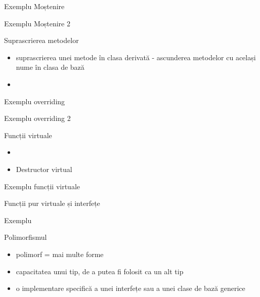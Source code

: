 \documentclass{beamer}
\begin{document}
\begin{frame}{Exemplu Moștenire}
  \footnotesize{}
\end{frame}   

\begin{frame}{Exemplu Moștenire 2}
  \footnotesize{}
\end{frame}

\begin{frame}{Suprascrierea metodelor}
  \begin{itemize}
  	\item suprascrierea unei metode în clasa derivată - ascunderea metodelor cu același nume în clasa de bază
	\item 
  \end{itemize} 
\end{frame}

\begin{frame}{Exemplu overriding}
  \footnotesize{}
\end{frame}

\begin{frame}{Exemplu overriding 2}
  \footnotesize{}
\end{frame}

\begin{frame}{Funcții virtuale}
  \begin{itemize}
  	\item 
	\item Destructor virtual
  \end{itemize}
\end{frame}

\begin{frame}{Exemplu funcții virtuale}
  \footnotesize{}
\end{frame}

\begin{frame}{Funcții pur virtuale și interfețe}
\end{frame}

\begin{frame}{Exemplu}
  \footnotesize{}
\end{frame}

\begin{frame}{Polimorfismul}
  \begin{itemize}
  \item polimorf = mai multe forme 
  \item capacitatea unui tip, de a putea fi folosit ca un alt tip
  \item o implementare specifică a unei interfețe sau a unei clase de bază generice
  \end{itemize}
\end{frame}
\end{document}
